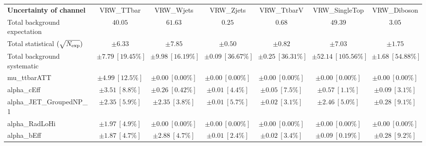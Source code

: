 
\begin{sidewaystable}
\begin{center}
\setlength{\tabcolsep}{0.0pc}
\begin{tabular*}{\textwidth}{@{\extracolsep{\fill}}lcccccc}
\noalign{\smallskip}\hline\noalign{\smallskip}
{\bf Uncertainty of channel}                                    & VRW\_TTbar            & VRW\_Wjets            & VRW\_Zjets            & VRW\_TtbarV            & VRW\_SingleTop            & VRW\_Diboson            \\
\noalign{\smallskip}\hline\noalign{\smallskip}
Total background expectation             &  $40.05$        &  $61.63$        &  $0.25$        &  $0.68$        &  $49.39$        &  $3.05$       \\
\noalign{\smallskip}\hline\noalign{\smallskip}
Total statistical $(\sqrt{N_{\rm exp}})$              & $\pm 6.33$        & $\pm 7.85$        & $\pm 0.50$        & $\pm 0.82$        & $\pm 7.03$        & $\pm 1.75$       \\
Total background systematic               & $\pm 7.79\ [19.45\%] $        & $\pm 9.98\ [16.19\%] $        & $\pm 0.09\ [36.67\%] $        & $\pm 0.25\ [36.31\%] $        & $\pm 52.14\ [105.56\%] $        & $\pm 1.68\ [54.88\%] $             \\
\noalign{\smallskip}\hline\noalign{\smallskip}
\noalign{\smallskip}\hline\noalign{\smallskip}
mu\_ttbarATT         & $\pm 4.99\ [12.5\%] $          & $\pm 0.00\ [0.00\%] $          & $\pm 0.00\ [0.00\%] $          & $\pm 0.00\ [0.00\%] $          & $\pm 0.00\ [0.00\%] $          & $\pm 0.00\ [0.00\%] $       \\
alpha\_cEff         & $\pm 3.51\ [8.8\%] $          & $\pm 0.26\ [0.42\%] $          & $\pm 0.01\ [4.4\%] $          & $\pm 0.05\ [7.5\%] $          & $\pm 0.57\ [1.1\%] $          & $\pm 0.09\ [3.1\%] $       \\
alpha\_JET\_GroupedNP\_1         & $\pm 2.35\ [5.9\%] $          & $\pm 2.35\ [3.8\%] $          & $\pm 0.01\ [5.7\%] $          & $\pm 0.02\ [3.1\%] $          & $\pm 2.46\ [5.0\%] $          & $\pm 0.28\ [9.1\%] $       \\
alpha\_RadLoHi         & $\pm 1.97\ [4.9\%] $          & $\pm 0.00\ [0.00\%] $          & $\pm 0.00\ [0.00\%] $          & $\pm 0.00\ [0.00\%] $          & $\pm 0.00\ [0.00\%] $          & $\pm 0.00\ [0.00\%] $       \\
alpha\_bEff         & $\pm 1.87\ [4.7\%] $          & $\pm 2.88\ [4.7\%] $          & $\pm 0.01\ [2.4\%] $          & $\pm 0.02\ [3.4\%] $          & $\pm 0.09\ [0.19\%] $          & $\pm 0.28\ [9.2\%] $       \\

\end{tabular*}
\end{center}
\end{sidewaystable}
